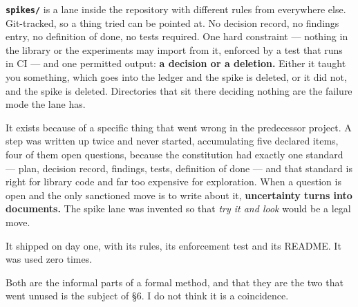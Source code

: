 \textbf{\texttt{spikes/}} is a lane inside the repository with different rules from everywhere else. Git-tracked, so a thing tried can be pointed at. No decision record, no findings entry, no definition of done, no tests required. One hard constraint --- nothing in the library or the experiments may import from it, enforced by a test that runs in CI --- and one permitted output: \textbf{a decision or a deletion.} Either it taught you something, which goes into the ledger and the spike is deleted, or it did not, and the spike is deleted. Directories that sit there deciding nothing are the failure mode the lane has.

It exists because of a specific thing that went wrong in the predecessor project. A step was written up twice and never started, accumulating five declared items, four of them open questions, because the constitution had exactly one standard --- plan, decision record, findings, tests, definition of done --- and that standard is right for library code and far too expensive for exploration. When a question is open and the only sanctioned move is to write about it, \textbf{uncertainty turns into documents.} The spike lane was invented so that \textit{try it and look} would be a legal move.

It shipped on day one, with its rules, its enforcement test and its README. It was used zero times.

Both are the informal parts of a formal method, and that they are the two that went unused is the subject of \S6. I do not think it is a coincidence.
